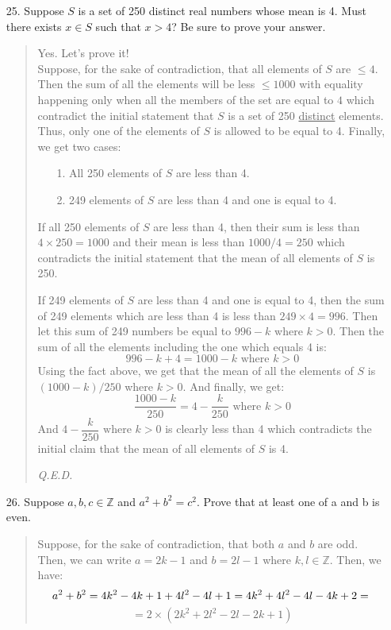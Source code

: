 \documentclass[12pt, a4paper]{article}                      %
\begin{document}
\begin{enumerate}
\item[25.]
Suppose $S$ is a set of 250 distinct real numbers whose mean is 4. Must there exists
$x \in S$ such that $x > 4$? Be sure to prove your answer.
\begin{quote}
Yes. Let's prove it!\\
Suppose, for the sake of contradiction, that all elements of $S$ are $\leq 4$.
Then the sum of all the elements will be less $\leq 1000$ with equality happening only
when all the members of the set are equal to $4$ which contradict the initial statement that
$S$ is a set of 250 \underline{distinct} elements. Thus, only one of the elements of $S$ is allowed
to be equal to 4. Finally, we get two cases:
\begin{center}
\begin{itemize}
\item[1.]
All 250 elements of $S$ are less than 4.
\item[2.]
249 elements of $S$ are less than 4 and one is equal to 4.
\end{itemize}
\end{center}
If all 250 elements of $S$ are less than 4, then their sum is less than $4 \times 250 = 1000$ and their mean
is less than $1000 / 4 = 250$ which contradicts the initial statement that the mean of all elements of $S$ is 250.

If 249 elements of $S$ are less than 4 and one is equal to 4, then the sum of 249 elements which are less than 4 is less than
$249 \times 4 = 996$. Then let this sum of 249 numbers be equal to $996 - k$ where $k > 0$. Then the sum of all the elements including
the one which equals 4 is:
$$
996 - k + 4 = 1000 - k \mbox{ where } k > 0
$$
Using the fact above, we get that the mean of all the elements of $S$ is $(1000 - k)/250$ where $k > 0$.
And finally, we get:
$$
\dfrac{1000 - k}{250} = 4 - \dfrac{k}{250} \mbox{ where } k > 0
$$
And $4 - \dfrac{k}{250} \mbox{ where } k > 0$ is clearly less than 4 which contradicts
the initial claim that the mean of all elements of $S$ is 4.
\begin{flushright}
\textit{Q.E.D.}
\end{flushright}
\end{quote}

\item[26.]
Suppose $a, b, c \in \mathbb{Z}$ and $a^2 + b^2 = c^2$.
Prove that at least one of a and b is even.
\begin{quote}
Suppose, for the sake of contradiction, that both $a$ and $b$ are odd.
Then, we can write $a = 2k - 1$ and $b = 2l - 1$ where $k,l \in \mathbb{Z}$.
Then, we have:
$$
a^2 + b^2 = 4k^2 - 4k + 1 + 4l^2 - 4l + 1 = 4k^2 + 4l^2 - 4l - 4k + 2 = \\
$$
$$
= 2 \times (2k^2 + 2l^2 - 2l - 2k + 1)
$$


\end{quote}
\end{enumerate}
\end{document}
